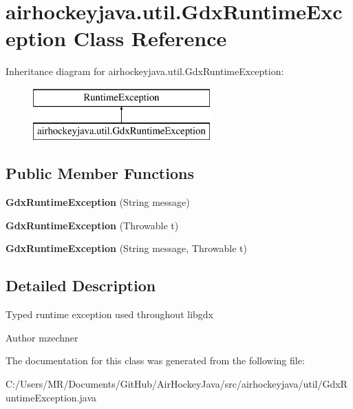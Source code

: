 \hypertarget{classairhockeyjava_1_1util_1_1_gdx_runtime_exception}{}\section{airhockeyjava.\+util.\+Gdx\+Runtime\+Exception Class Reference}
\label{classairhockeyjava_1_1util_1_1_gdx_runtime_exception}
Inheritance diagram for airhockeyjava.\+util.\+Gdx\+Runtime\+Exception\+:\begin{figure}[H]
\begin{center}
\leavevmode
\includegraphics[height=2.000000cm]{classairhockeyjava_1_1util_1_1_gdx_runtime_exception}
\end{center}
\end{figure}
\subsection*{Public Member Functions}
\begin{DoxyCompactItemize}
\item 
\hypertarget{classairhockeyjava_1_1util_1_1_gdx_runtime_exception_a17e63930c9fa2c062dd4881a0ba5cf96}{}{\bfseries Gdx\+Runtime\+Exception} (String message)\label{classairhockeyjava_1_1util_1_1_gdx_runtime_exception_a17e63930c9fa2c062dd4881a0ba5cf96}

\item 
\hypertarget{classairhockeyjava_1_1util_1_1_gdx_runtime_exception_a7ea732e2bc45b2d048615bb47eb6ad03}{}{\bfseries Gdx\+Runtime\+Exception} (Throwable t)\label{classairhockeyjava_1_1util_1_1_gdx_runtime_exception_a7ea732e2bc45b2d048615bb47eb6ad03}

\item 
\hypertarget{classairhockeyjava_1_1util_1_1_gdx_runtime_exception_a7ce9792cde4b9bdb9df6f10e30fefca8}{}{\bfseries Gdx\+Runtime\+Exception} (String message, Throwable t)\label{classairhockeyjava_1_1util_1_1_gdx_runtime_exception_a7ce9792cde4b9bdb9df6f10e30fefca8}

\end{DoxyCompactItemize}


\subsection{Detailed Description}
Typed runtime exception used throughout libgdx

\begin{DoxyAuthor}{Author}
mzechner 
\end{DoxyAuthor}


The documentation for this class was generated from the following file\+:\begin{DoxyCompactItemize}
\item 
C\+:/\+Users/\+M\+R/\+Documents/\+Git\+Hub/\+Air\+Hockey\+Java/src/airhockeyjava/util/Gdx\+Runtime\+Exception.\+java\end{DoxyCompactItemize}
